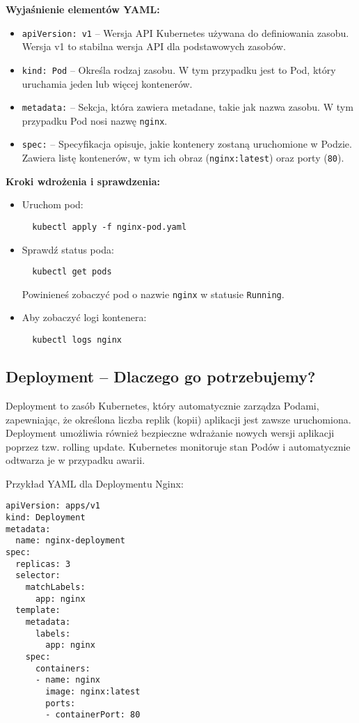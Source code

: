 \documentclass{article}
\begin{document}
\textbf{Wyjaśnienie elementów YAML:}
\begin{itemize}
  \item \texttt{apiVersion: v1} – Wersja API Kubernetes używana do definiowania zasobu. Wersja v1 to stabilna wersja API dla podstawowych zasobów.
  \item \texttt{kind: Pod} – Określa rodzaj zasobu. W tym przypadku jest to Pod, który uruchamia jeden lub więcej kontenerów.
  \item \texttt{metadata:} – Sekcja, która zawiera metadane, takie jak nazwa zasobu. W tym przypadku Pod nosi nazwę \texttt{nginx}.
  \item \texttt{spec:} – Specyfikacja opisuje, jakie kontenery zostaną uruchomione w Podzie. Zawiera listę kontenerów, w tym ich obraz (\texttt{nginx:latest}) oraz porty (\texttt{80}).
\end{itemize}

\textbf{Kroki wdrożenia i sprawdzenia:}
\begin{itemize}
  \item Uruchom pod:
  \begin{lstlisting}
  kubectl apply -f nginx-pod.yaml
  \end{lstlisting}
  \item Sprawdź status poda:
  \begin{lstlisting}
  kubectl get pods
  \end{lstlisting}
  Powinieneś zobaczyć pod o nazwie \texttt{nginx} w statusie \texttt{Running}.
  \item Aby zobaczyć logi kontenera:
  \begin{lstlisting}
  kubectl logs nginx
  \end{lstlisting}
\end{itemize}

\subsection{Deployment – Dlaczego go potrzebujemy?}
Deployment to zasób Kubernetes, który automatycznie zarządza Podami, zapewniając, że określona liczba replik (kopii) aplikacji jest zawsze uruchomiona. Deployment umożliwia również bezpieczne wdrażanie nowych wersji aplikacji poprzez tzw. rolling update. Kubernetes monitoruje stan Podów i automatycznie odtwarza je w przypadku awarii.

Przykład YAML dla Deploymentu Nginx:
\begin{lstlisting}
apiVersion: apps/v1
kind: Deployment
metadata:
  name: nginx-deployment
spec:
  replicas: 3
  selector:
    matchLabels:
      app: nginx
  template:
    metadata:
      labels:
        app: nginx
    spec:
      containers:
      - name: nginx
        image: nginx:latest
        ports:
        - containerPort: 80
\end{lstlisting}
\end{document}
